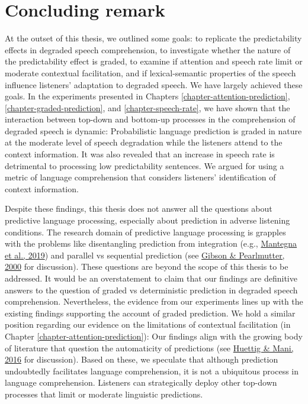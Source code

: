 \documentclass[a4paper, nobind]{templates/ociamthesis}
\begin{document}
\hypertarget{concluding-remark}{%
\section{Concluding remark}\label{concluding-remark}}

At the outset of this thesis, we outlined some goals:
to replicate the predictability effects in degraded speech comprehension,
to investigate whether the nature of the predictability effect is graded,
to examine if attention and speech rate limit or moderate contextual facilitation,
and if lexical-semantic properties of the speech influence listeners' adaptation to degraded speech.
We have largely achieved these goals.
In the experiments presented in Chapters \ref{chapter-attention-prediction}, \ref{chapter-graded-prediction}, and \ref{chapter-speech-rate}, we have shown that the interaction between top-down and bottom-up processes in the comprehension of degraded speech is dynamic:
Probabilistic language prediction is graded in nature at the moderate level of speech degradation while the listeners attend to the context information.
It was also revealed that an increase in speech rate is detrimental to processing low predictability sentences.
We argued for using a metric of language comprehension that considers listeners' identification of context information.

Despite these findings, this thesis does not answer all the questions about predictive language processing, especially about prediction in adverse listening conditions.
The research domain of predictive language processing is grapples with the problems like disentangling prediction from integration (e.g., \protect\hyperlink{ref-Mantegna2019}{Mantegna et al., 2019}) and
parallel vs sequential prediction (see \protect\hyperlink{ref-Gibson2000}{Gibson \& Pearlmutter, 2000} for discussion).
These questions are beyond the scope of this thesis to be addressed.
It would be an overstatement to claim that our findings are definitive answers to the question of graded vs deterministic prediction in degraded speech comprehension.
Nevertheless, the evidence from our experiments lines up with the existing findings supporting the account of graded prediction.
We hold a similar position regarding our evidence on the limitations of contextual facilitation (in Chapter \ref{chapter-attention-prediction}):
Our findings align with the growing body of literature that question the automaticity of predictions (see \protect\hyperlink{ref-Huettig2016}{Huettig \& Mani, 2016} for discussion).
Based on these, we speculate that although prediction undoubtedly facilitates language comprehension,
it is not a ubiquitous process in language comprehension.
Listeners can strategically deploy other top-down processes that limit or moderate linguistic predictions.
\end{document}
